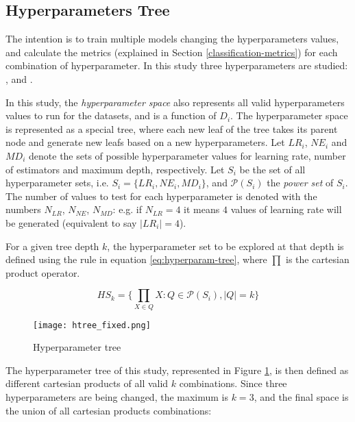 \subsection{Hyperparameters Tree}
\label{subsec:hp-tree}

The intention is to train multiple models changing the hyperparameters values, and calculate the metrics (explained in Section \ref{classification-metrics}) for each combination of hyperparameter. In this study three hyperparameters are studied: \textbf{}, \textbf{} and \textbf{}.

In this study, the  \textit{hyperparameter space} also represents all valid hyperparameters values to run for the datasets, and is a function of $D_i$. The hyperparameter space is represented as a special tree, where each new leaf of the tree takes its parent node and generate new leafs based on a new hyperparameters. Let $LR_i$, $NE_i$ and $MD_i$ denote the sets of possible hyperparameter values for learning rate, number of estimators and maximum depth, respectively. Let $S_i$ be the set of all hyperparameter sets, i.e. $S_i = \{LR_i, NE_i, MD_i\}$, and $\mathcal{P}(S_i)$ the \textit{power set} of $S_i$. The number of values to test for each hyperparameter is denoted with the numbers $N_{LR}$, $N_{NE}$, $N_{MD}$: e.g. if $N_{LR} = 4$ it means $4$ values of learning rate will be generated (equivalent to say $|LR_i| = 4$).

For a given tree depth $k$, the hyperparameter set to be explored at that depth is defined using the rule in equation \ref{eq:hyperparam-tree}, where $\prod$ is the cartesian product operator.

\begin{equation}\label{eq:hyperparam-tree}
    HS_k = \Big\{\prod_{X \in Q} X : Q \in \mathcal{P}(S_i), |Q| = k\Big\}
\end{equation}

\begin{figure}[!h]
    \centering
    \texttt{[image: htree\_fixed.png]} 
    \caption{Hyperparameter tree}
    \label{fig:hp-tree}
\end{figure}

The hyperparameter tree of this study, represented in Figure \ref{fig:hp-tree}, is then defined as different cartesian products of all valid $k$ combinations. Since three hyperparameters are being changed, the maximum is $k=3$, and the final space is the union of all cartesian products combinations:

